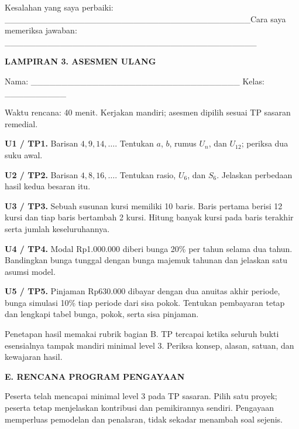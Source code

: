 \documentclass[11pt,a4paper]{article}
\begin{document}
{\small Kesalahan yang saya perbaiki: \_\_\_\_\_\_\_\_\_\_\_\_\_\_\_\_\_\_\_\_\_\_\_\_\_\_\_\_\_\_\_\_\_\_\_\_\_\_\_\_\newline Cara saya memeriksa jawaban: \_\_\_\_\_\_\_\_\_\_\_\_\_\_\_\_\_\_\_\_\_\_\_\_\_\_\_\_\_\_\_\_\_\_\_\_\_\_\_\_\_\par}\medskip
\clearpage
\begin{center}\bfseries\large LAMPIRAN 3. ASESMEN ULANG\end{center}\medskip
{\small Nama: \_\_\_\_\_\_\_\_\_\_\_\_\_\_\_\_\_\_\_\_\_\_\_\_\_\_\_\_\_\_\_\_\_\_  Kelas: \_\_\_\_\_\_\_\_\_\_\par}\medskip
{\small Waktu rencana: 40 menit. Kerjakan mandiri; asesmen dipilih sesuai TP sasaran remedial.\par}\medskip
\noindent\textbf{U1 / TP1.} Barisan \(4,9,14,\ldots\). Tentukan \(a\), \(b\), rumus \(U_n\), dan \(U_{12}\); periksa dua suku awal.\par\vspace{10mm}
\noindent\textbf{U2 / TP2.} Barisan \(4,8,16,\ldots\). Tentukan rasio, \(U_6\), dan \(S_6\). Jelaskan perbedaan hasil kedua besaran itu.\par\vspace{10mm}
\noindent\textbf{U3 / TP3.} Sebuah susunan kursi memiliki 10 baris. Baris pertama berisi 12 kursi dan tiap baris bertambah 2 kursi. Hitung banyak kursi pada baris terakhir serta jumlah keseluruhannya.\par\vspace{10mm}
\noindent\textbf{U4 / TP4.} Modal Rp1.000.000 diberi bunga 20\% per tahun selama dua tahun. Bandingkan bunga tunggal dengan bunga majemuk tahunan dan jelaskan satu asumsi model.\par\vspace{10mm}
\noindent\textbf{U5 / TP5.} Pinjaman Rp630.000 dibayar dengan dua anuitas akhir periode, bunga simulasi 10\% tiap periode dari sisa pokok. Tentukan pembayaran tetap dan lengkapi tabel bunga, pokok, serta sisa pinjaman.\par\vspace{10mm}
{\small Penetapan hasil memakai rubrik bagian B. TP tercapai ketika seluruh bukti esensialnya tampak mandiri minimal level 3. Periksa konsep, alasan, satuan, dan kewajaran hasil.\par}\medskip
\clearpage
\begin{center}\bfseries\large E. RENCANA PROGRAM PENGAYAAN\end{center}\medskip
Peserta telah mencapai minimal level 3 pada TP sasaran. Pilih satu proyek; peserta tetap menjelaskan kontribusi dan pemikirannya sendiri. Pengayaan memperluas pemodelan dan penalaran, tidak sekadar menambah soal sejenis.\par\medskip
\end{document}
